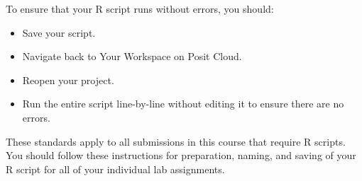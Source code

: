 \documentclass[
]{article}
\providecommand{\tightlist}{%
  \setlength{\itemsep}{0pt}\setlength{\parskip}{0pt}}
\begin{document}
To ensure that your R script runs without errors, you should:

\begin{itemize}
\tightlist
\item
  Save your script.
\item
  Navigate back to Your Workspace on Posit Cloud.
\item
  Reopen your project.
\item
  Run the entire script line-by-line without editing it to ensure there
  are no errors.
\end{itemize}

\begin{tcolorbox}[enhanced jigsaw, arc=.35mm, bottomrule=.15mm, bottomtitle=1mm, breakable, colback=white, colbacktitle=quarto-callout-important-color!10!white, colframe=quarto-callout-important-color-frame, coltitle=black, left=2mm, leftrule=.75mm, opacityback=0, opacitybacktitle=0.6, rightrule=.15mm, title=\textcolor{quarto-callout-important-color}{\faExclamation}\hspace{0.5em}{Important}, titlerule=0mm, toprule=.15mm, toptitle=1mm]

These standards apply to all submissions in this course that require R
scripts. You should follow these instructions for preparation, naming,
and saving of your R script for all of your individual lab assignments.

\end{tcolorbox}
\end{document}

